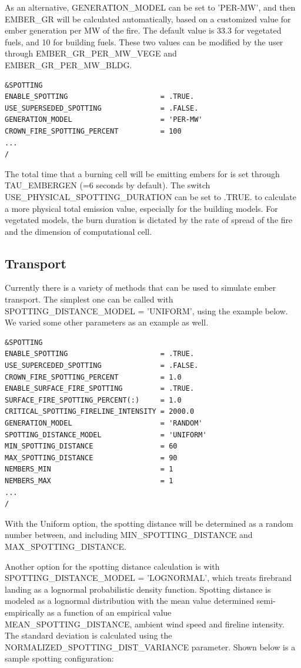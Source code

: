 As an alternative, GENERATION\_MODEL can be set to 'PER-MW', and then EMBER\_GR will be calculated automatically, based on a customized value for ember generation per MW of the fire. The default value is 33.3 for vegetated fuels, and 10 for building fuels. These two values can be modified by the user through EMBER\_GR\_PER\_MW\_VEGE and EMBER\_GR\_PER\_MW\_BLDG.

\begin{verbatim}
&SPOTTING
ENABLE_SPOTTING 					 = .TRUE.
USE_SUPERSEDED_SPOTTING 			 = .FALSE.
GENERATION_MODEL                     = 'PER-MW'
CROWN_FIRE_SPOTTING_PERCENT 		 = 100
...
/
\end{verbatim}

The total time that a burning cell will be emitting embers for is set through TAU\_EMBERGEN (=6 seconds by default). The switch USE\_PHYSICAL\_SPOTTING\_DURATION can be set to .TRUE. to calculate a more physical total emission value, especially for the building models. For vegetated models, the burn duration is dictated by the rate of spread of the fire and the dimension of computational cell. 

\subsection{Transport}
\label{ember_transport}
Currently there is a variety of methods that can be used to simulate ember transport. The simplest one can be called with SPOTTING\_DISTANCE\_MODEL = 'UNIFORM', using the example below. We varied some other parameters as an example as well.

\begin{verbatim}
&SPOTTING
ENABLE_SPOTTING                      = .TRUE.
USE_SUPERCEDED_SPOTTING              = .FALSE.
CROWN_FIRE_SPOTTING_PERCENT          = 1.0
ENABLE_SURFACE_FIRE_SPOTTING         = .TRUE.
SURFACE_FIRE_SPOTTING_PERCENT(:)     = 1.0
CRITICAL_SPOTTING_FIRELINE_INTENSITY = 2000.0
GENERATION_MODEL                     = 'RANDOM'
SPOTTING_DISTANCE_MODEL              = 'UNIFORM'
MIN_SPOTTING_DISTANCE                = 60
MAX_SPOTTING_DISTANCE                = 90
NEMBERS_MIN                          = 1
NEMBERS_MAX                          = 1
...
/
\end{verbatim}

With the Uniform option, the spotting distance will be determined as a random number between, and including MIN\_SPOTTING\_DISTANCE and MAX\_SPOTTING\_DISTANCE. 

Another option for the spotting distance calculation is with SPOTTING\_DISTANCE\_MODEL = 'LOGNORMAL', which treats firebrand landing as a lognormal probabilistic density function. Spotting distance is modeled as a lognormal distribution with the mean value determined semi-empirically as a function of an empirical value MEAN\_SPOTTING\_DISTANCE, ambient wind speed and fireline intensity. The standard deviation is calculated using the NORMALIZED\_SPOTTING\_DIST\_VARIANCE parameter. Shown below is a sample spotting configuration:

